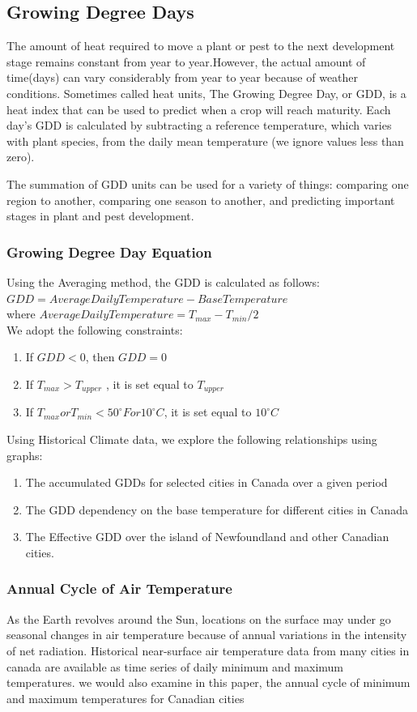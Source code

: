 \documentclass[12pt]{article}
\begin{document}
\subsection{Growing Degree Days}
The amount of heat required to move a plant or pest to the next development stage remains constant from year to year.However, the actual amount of time(days) can vary considerably from year to year because of weather conditions. Sometimes called heat units, The Growing Degree Day, or GDD, is a heat index that can be used to predict when a crop will reach maturity. Each day’s GDD is calculated by subtracting a reference temperature, which varies with plant species, from the daily mean temperature (we ignore values less than zero).  

The summation of GDD units can be used for a variety of things: comparing one region to another, comparing one season to another, and predicting important stages in plant and pest development.


\subsubsection{Growing Degree Day Equation }
Using the Averaging method, the GDD is calculated as follows:\\
$ GDD = Average Daily Temperature - Base Temperature$\\
where $Average Daily Temperature = T_{max} - T_{min} /2 $\\

We adopt the following constraints:
\begin{enumerate}
\item If $GDD < 0$, then $GDD = 0$
\item If $T_{max} > T_{upper}$ , it is set equal to $T_{upper}$
\item If $T_{max} or  T_{min}  < 50^{\circ}F or 10^{\circ}C$, it is set equal to $10^{\circ}C$
\end{enumerate}
Using Historical Climate data, we explore the following relationships using graphs:
\begin{enumerate}
\item The accumulated GDDs for selected cities in Canada over a given period
\item The GDD dependency on the base temperature for different cities in Canada
\item The Effective GDD over the island of Newfoundland and other Canadian cities.
\end{enumerate}
\subsubsection{Annual Cycle of Air Temperature}
As the Earth revolves around the Sun, locations on the surface may under go seasonal changes in air temperature because of annual variations in the intensity of net radiation.
Historical near-surface air temperature data from many cities in canada are available as time series of daily minimum and maximum temperatures. we would also examine in this paper, the annual cycle of minimum and maximum temperatures for Canadian cities
\end{document}
